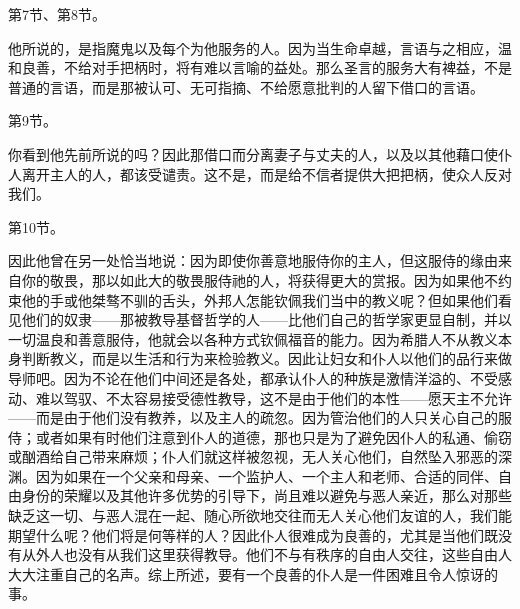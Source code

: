 第7节、第8节。\par

他所说的，是指魔鬼以及每个为他服务的人。因为当生命卓越，言语与之相应，温和良善，不给对手把柄时，将有难以言喻的益处。那么圣言的服务大有裨益，不是普通的言语，而是那被认可、无可指摘、不给愿意批判的人留下借口的言语。\par

第9节。\par

你看到他先前所说的吗？因此那借口而分离妻子与丈夫的人，以及以其他藉口使仆人离开主人的人，都该受谴责。这不是，而是给不信者提供大把把柄，使众人反对我们。\par

\par

第10节。\par

因此他曾在另一处恰当地说：因为即使你善意地服侍你的主人，但这服侍的缘由来自你的敬畏，那以如此大的敬畏服侍祂的人，将获得更大的赏报。因为如果他不约束他的手或他桀骜不驯的舌头，外邦人怎能钦佩我们当中的教义呢？但如果他们看见他们的奴隶——那被教导基督哲学的人——比他们自己的哲学家更显自制，并以一切温良和善意服侍，他就会以各种方式钦佩福音的能力。因为希腊人不从教义本身判断教义，而是以生活和行为来检验教义。因此让妇女和仆人以他们的品行来做导师吧。因为不论在他们中间还是各处，都承认仆人的种族是激情洋溢的、不受感动、难以驾驭、不太容易接受德性教导，这不是由于他们的本性——愿天主不允许——而是由于他们没有教养，以及主人的疏忽。因为管治他们的人只关心自己的服侍；或者如果有时他们注意到仆人的道德，那也只是为了避免因仆人的私通、偷窃或酗酒给自己带来麻烦；仆人们就这样被忽视，无人关心他们，自然坠入邪恶的深渊。因为如果在一个父亲和母亲、一个监护人、一个主人和老师、合适的同伴、自由身份的荣耀以及其他许多优势的引导下，尚且难以避免与恶人亲近，那么对那些缺乏这一切、与恶人混在一起、随心所欲地交往而无人关心他们友谊的人，我们能期望什么呢？他们将是何等样的人？因此仆人很难成为良善的，尤其是当他们既没有从外人也没有从我们这里获得教导。他们不与有秩序的自由人交往，这些自由人大大注重自己的名声。综上所述，要有一个良善的仆人是一件困难且令人惊讶的事。\par

